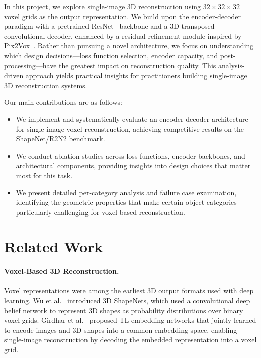 \documentclass[10pt,twocolumn,letterpaper]{article}
\begin{document}
In this project, we explore single-image 3D reconstruction using $32 \times 32 \times 32$ voxel grids as the output representation. We build upon the encoder-decoder paradigm with a pretrained ResNet~\cite{he2016resnet} backbone and a 3D transposed-convolutional decoder, enhanced by a residual refinement module inspired by Pix2Vox~\cite{xie2019pix2vox}. Rather than pursuing a novel architecture, we focus on understanding which design decisions---loss function selection, encoder capacity, and post-processing---have the greatest impact on reconstruction quality. This analysis-driven approach yields practical insights for practitioners building single-image 3D reconstruction systems.

Our main contributions are as follows:
\begin{itemize}
    \item We implement and systematically evaluate an encoder-decoder architecture for single-image voxel reconstruction, achieving competitive results on the ShapeNet/R2N2 benchmark.
    \item We conduct ablation studies across loss functions, encoder backbones, and architectural components, providing insights into design choices that matter most for this task.
    \item We present detailed per-category analysis and failure case examination, identifying the geometric properties that make certain object categories particularly challenging for voxel-based reconstruction.
\end{itemize}

\section{Related Work}
\label{sec:related}

\paragraph{Voxel-Based 3D Reconstruction.}
Voxel representations were among the earliest 3D output formats used with deep learning. Wu et al.~\cite{wu20153d} introduced 3D ShapeNets, which used a convolutional deep belief network to represent 3D shapes as probability distributions over binary voxel grids. Girdhar et al.~\cite{girdhar2016learning} proposed TL-embedding networks that jointly learned to encode images and 3D shapes into a common embedding space, enabling single-image reconstruction by decoding the embedded representation into a voxel grid.
\end{document}
